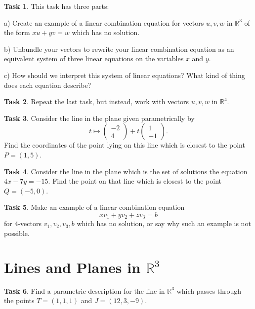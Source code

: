 \documentclass{tufte-book}
\theoremstyle{definition}
\newtheorem{task}{Task}
\begin{document}
\begin{task} This task has three parts:
\begin{compactitem}
\item[a)] Create an example of a linear combination equation for vectors $u, v, w$ in $\mathbb{R}^3$ of the form $x u + y v = w$ which has no solution.
\item[b)] Unbundle your vectors to rewrite your linear combination equation as an equivalent system of three linear equations on the variables $x$ and $y$.
\item[c)] How should we interpret this system of linear equations? What kind of thing does each equation describe?
\end{compactitem}
\end{task}


\begin{task}
Repeat the last task, but instead, work with vectors $u, v, w$ in $\mathbb{R}^4$.
\end{task}


\begin{task}
Consider the line in the plane given parametrically by 
\[
t \mapsto \begin{pmatrix} -2 \\ 4 \end{pmatrix} + t \begin{pmatrix} 1 \\ -1\end{pmatrix}.
\]
Find the coordinates of the point lying on this line which is closest to the point $P = (1,5)$.
\end{task}


\begin{task}
Consider the line in the plane which is the set of solutions the equation $4x-7y=-15$. Find the point on that line which is closest to the point $Q=(-5,0)$.
\end{task}

\begin{task}
Make an example of a linear combination equation 
\[
xv_1 + y v_2 + z v_3 = b
\]
for $4$-vectors $v_1, v_2, v_3, b$ which has no solution, or say why such an example is not possible.
\end{task}

\section*{Lines and Planes in $\mathbb{R}^3$}


\begin{task}
Find a parametric description for the line in $\mathbb{R}^3$ which passes through the points $T = (1,1,1)$ and $J=(12,3,-9)$.
\end{task}
\end{document}
